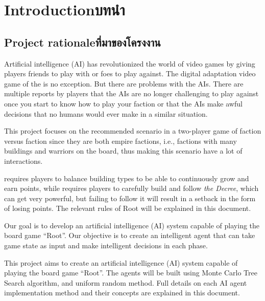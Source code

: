 \chapter{\ifenglish Introduction\else บทนำ\fi}

\section{\ifenglish Project rationale\else ที่มาของโครงงาน\fi}
Artificial intelligence (AI) has revolutionized the world of video games by giving players friends to play with or foes to play against. The digital adaptation video game of the \RootB{} is no exception. But there are problems with the AIs. There are multiple reports by \RootV{} players that the AIs are no longer challenging to play against once you start to know how to play your faction or that the AIs make awful decisions that no humans would ever make in a similar situation.

This project focuses on the recommended scenario in a two-player game of \Marquise{} faction versus \Eyrie{} faction since they are both empire factions, i.e., factions with many buildings and warriors on the board, thus making this scenario have a lot of interactions.

%
%
\Marquise{} requires players to balance building types to be able to continuously grow and earn points, while \Eyrie{} requires players to carefully build and follow \textit{the Decree}, which can get very powerful, but failing to follow it will result in a setback in the form of losing points. The relevant rules of Root will be explained in this document.
%

Our goal is to develop an artificial intelligence (AI) system capable of playing the board game ``Root''. Our objective is to create an intelligent agent that can take game state as input and make intelligent decisions in each phase.

This project aims to create an artificial intelligence (AI) system capable of playing the board game ``Root''. The agents will be built using Monte Carlo Tree Search algorithm, and uniform random method. Full details on each AI agent implementation method and their concepts are explained in this document.



